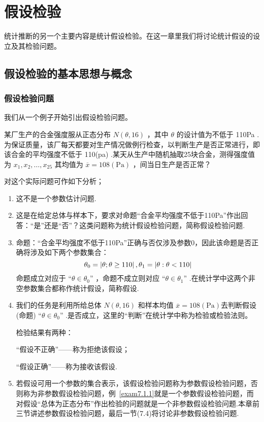 \chapter{假设检验\label{cha:7}}
统计推断的另一个主要内容是统计假设检验。在这一章里我们将讨论统计假设的设立及其检验问题。

\section{假设检验的基本思想与概念}\label{sec:7.1}
\subsection{假设检验问题\label{7.1.1}}
我们从一个例子开始引出假设检验问题。
\begin{example}\label{exam7.1.1}
某厂生产的合金强度服从正态分布 $N(\theta,16)$ ，其中 $\theta$ 的设计值为不低于 110Pa .为保证质量，该厂每天都要对生产情况做例行检查，以判断生产是否正常进行，即该合金的平均强度不低于 110(pa) .某天从生产中随机抽取25块合金，测得强度值为 $x_{1},x_{2},\dotsc,x_{25}$ 其均值为 $\overline{x}=108(\mathrm {Pa})$ ，间当日生产是否正常？

对这个实际问题可作如下分析；
\begin{enumerate}
	\item 这不是一个参数估计问题.
	
	\item 这是在给定总体与样本下，要求对命题“合金平均强度不低于110Pa”作出回答：“是”还是“否”？这类问题称为统计假设检验问题，简称假设检验问题.
	
	\item 命题：“合金平均强度不低于110Pa”正确与否仅涉及参数0，因此该命题是否正确将涉及如下两个参数集合：
	\[
	\theta_0=\left|\theta ;\theta\geq 110\right|,\\\theta_1=\left|\theta :\theta <110\right|
	\]
	命题成立对应于 “$\theta\in\theta_0$” ，命题不成立则对应 “$\theta\in\theta_1$” .在统计学中这两个非空参数集合都称作统计假设，简称假设.
	\item 我们的任务是利用所给总体 $N(\theta,16)$ 和样本均值 $\overline{x}=108(\mathrm {Pa})$去判断假设(命题) “$\theta\in\theta_0$” .是否成立，这里的“判断”在统计学中称为检验或检验法则。
	
	检验结果有两种：
	\begin{center}
		“假设不正确”——称为拒绝该假设；
		
		“假设正确”——称为接收该假设.
	\end{center}
	\item 若假设可用一个参数的集合表示，该假设检验问题称为参数假设检验问题，否则称为非参数假设检验问题，例~\ref{exam7.1.1}就是一个参数假设检验问题，而对假设“总体为正态分布”作出检验的问题就是一个非参数假设检验问题.本章前三节讲述参数假设检验问题，最后一节(7.4)将讨论非参数假设检验问题.
\end{enumerate}

\end{example}


